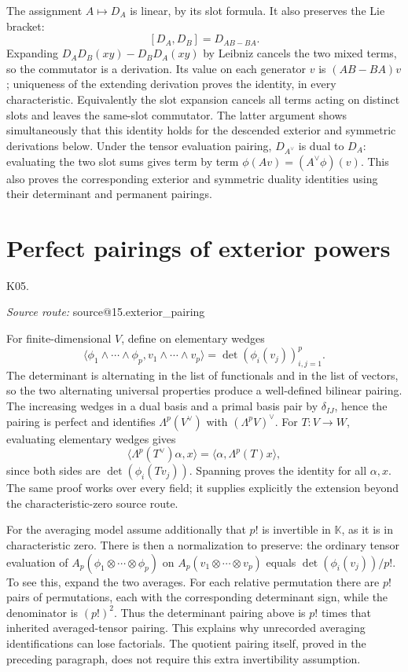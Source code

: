 \documentclass[11pt,a4paper]{book}
\makeatletter
\theoremstyle{definition}\newtheorem{definition}[theorem]{Definition}
\theoremstyle{remark}\newtheorem{remark}[theorem]{Remark}
\newcommand{\K}{\mathbb K}\newcommand{\R}{\mathbb R}\newcommand{\C}{\mathbb C}
\newcommand{\Kentry}[2]{\section{#2}\label{k:#1}\noindent\textsf{\small K05.\detokenize{#1}}\par
  \begingroup\small\color{black!65}\textit{Source route: }\csname source@#1\endcsname\par\endgroup}
\makeatother
\begin{document}
The assignment $A\mapsto D_A$ is linear, by its slot formula. It also preserves the Lie bracket:
\[
 [D_A,D_B]=D_{AB-BA}.
\]
Expanding $D_AD_B(xy)-D_BD_A(xy)$ by Leibniz cancels the two mixed terms, so the commutator is a derivation. Its value on each generator $v$ is $(AB-BA)v$; uniqueness of the extending derivation proves the identity, in every characteristic. Equivalently the slot expansion cancels all terms acting on distinct slots and leaves the same-slot commutator. The latter argument shows simultaneously that this identity holds for the descended exterior and symmetric derivations below. Under the tensor evaluation pairing, $D_{A^\vee}$ is dual to $D_A$: evaluating the two slot sums gives term by term $\phi(Av)=(A^\vee\phi)(v)$. This also proves the corresponding exterior and symmetric duality identities using their determinant and permanent pairings.

\Kentry{15.exterior_pairing}{Perfect pairings of exterior powers}
For finite-dimensional $V$, define on elementary wedges
\[
 \langle\phi_1\wedge\cdots\wedge\phi_p,
          v_1\wedge\cdots\wedge v_p\rangle
 =\det(\phi_i(v_j))_{i,j=1}^p.
\]
The determinant is alternating in the list of functionals and in the list of vectors, so the two alternating universal properties produce a well-defined bilinear pairing. The increasing wedges in a dual basis and a primal basis pair by $\delta_{IJ}$, hence the pairing is perfect and identifies $\Lambda^p(V^\vee)$ with $(\Lambda^pV)^\vee$. For $T:V\to W$, evaluating elementary wedges gives
\[
 \langle\Lambda^p(T^\vee)\alpha,x\rangle
 =\langle\alpha,\Lambda^p(T)x\rangle,
\]
since both sides are $\det(\phi_i(Tv_j))$. Spanning proves the identity for all $\alpha,x$. The same proof works over every field; it supplies explicitly the extension beyond the characteristic-zero source route.

For the averaging model assume additionally that $p!$ is invertible in $\K$, as it is in characteristic zero. There is then a normalization to preserve: the ordinary tensor evaluation of $A_p(\phi_1\otimes\cdots\otimes\phi_p)$ on $A_p(v_1\otimes\cdots\otimes v_p)$ equals $\det(\phi_i(v_j))/p!$. To see this, expand the two averages. For each relative permutation there are $p!$ pairs of permutations, each with the corresponding determinant sign, while the denominator is $(p!)^2$. Thus the determinant pairing above is $p!$ times that inherited averaged-tensor pairing. This explains why unrecorded averaging identifications can lose factorials. The quotient pairing itself, proved in the preceding paragraph, does not require this extra invertibility assumption.
\end{document}
